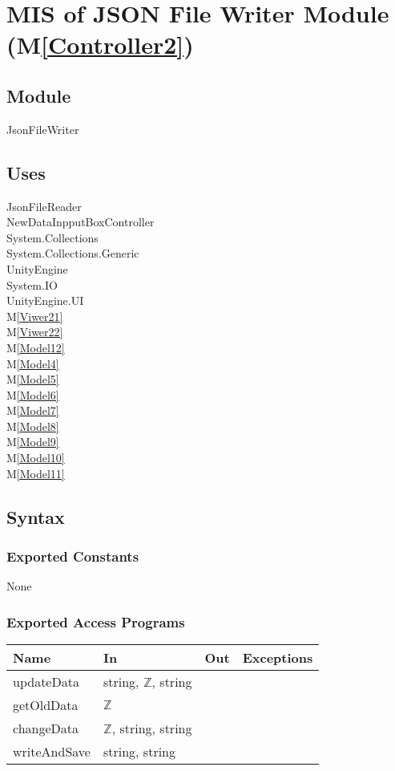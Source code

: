 \documentclass[12pt, titlepage]{article}
\newcommand{\mref}[1]{M\ref{#1}}
\begin{document}
\section{MIS of JSON File Writer Module (\mref{Controller2})}

\subsection{Module}
JsonFileWriter

\subsection{Uses}
JsonFileReader\\
NewDataInpputBoxController\\
System.Collections\\
System.Collections.Generic\\
UnityEngine\\
System.IO\\
UnityEngine.UI\\
\mref{Viwer21}\\
\mref{Viwer22}\\
\mref{Model12}\\
\mref{Model4}\\
\mref{Model5}\\
\mref{Model6}\\
\mref{Model7}\\
\mref{Model8}\\
\mref{Model9}\\
\mref{Model10}\\
\mref{Model11}\\

\subsection{Syntax}
\subsubsection{Exported Constants}
None
\subsubsection{Exported Access Programs}

\begin{center}
\begin{tabular}{|l|l|l|p{5cm}|}
\hline
\textbf{Name} & \textbf{In} & \textbf{Out} & \textbf{Exceptions} \\
\hline
updateData & string, $\mathbb{Z}$, string &  &  \\
\hline
getOldData& $\mathbb{Z}$ & & \\ 
\hline
changeData& $\mathbb{Z}$, string, string & & \\
\hline
writeAndSave & string, string  &   & \\
\hline
\end{tabular}
\end{center}
\end{document}
